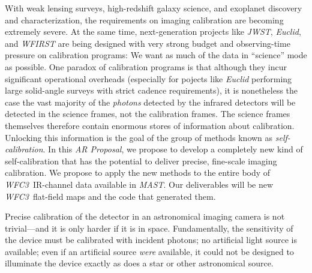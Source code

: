 \documentclass[12pt]{article}
\newcommand{\documentname}{\textsl{AR Proposal}}
\newcommand{\project}[1]{\textsl{#1}}
\newcommand{\WFC}{\project{WFC3}}
\newcommand{\MAST}{\project{MAST}}
\begin{document}
%
%
\justification          %

With weak lensing surveys, high-redshift galaxy science, and exoplanet
discovery and characterization, the requirements on imaging
calibration are becoming extremely severe.  At the same time,
next-generation projects like \project{JWST}, \project{Euclid}, and
\project{WFIRST} are being designed with very strong budget and
observing-time pressure on calibration programs: We want as much of
the data in ``science'' mode as possible.  One paradox of calibration
programs is that although they incur significant operational overheads
(especially for pojects like \project{Euclid} performing large
solid-angle surveys with strict cadence requirements), it is
nonetheless the case the vast majority of the \emph{photons} detected
by the infrared detectors will be detected in the science frames, not
the calibration frames.  The science frames themselves therefore
contain enormous stores of information about calibration.  Unlocking
this information is the goal of the group of methods known as
\emph{self-calibration}.  In this \documentname, we propose to develop
a completely new kind of self-calibration that has the potential to
deliver precise, fine-scale imaging calibration.  We propose to apply
the new methods to the entire body of \WFC\ IR-channel data available
in \MAST.  Our deliverables will be new \WFC\ flat-field maps and the
code that generated them.

Precise calibration of the detector in an astronomical imaging camera
is not trivial---and it is only harder if it is in space.
Fundamentally, the sensitivity of the device must be calibrated with
incident photons; no artificial light source is available; even if an
artificial source \emph{were} available, it could not be designed to
illuminate the device exactly as does a star or other astronomical
source.
\end{document}
